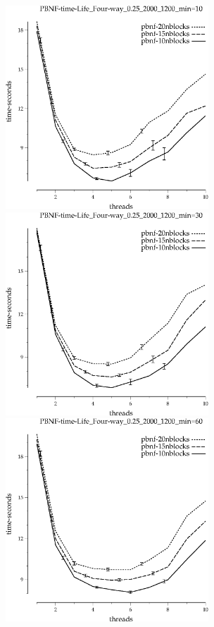 \documentclass{article}
\begin{document}
\begin{appendices}
\begin{figure}[h]
\begin{center}
\includegraphics[width=3in]{../graphs/grid_life_four-way_0.25_2000_1200/PBNF-time-Life_Four-way_0.25_2000_1200_min=10.eps}
\includegraphics[width=3in]{../graphs/grid_life_four-way_0.25_2000_1200/PBNF-time-Life_Four-way_0.25_2000_1200_min=30.eps}
\includegraphics[width=3in]{../graphs/grid_life_four-way_0.25_2000_1200/PBNF-time-Life_Four-way_0.25_2000_1200_min=60.eps}

\end{center}
\end{figure}
\end{appendices}
\end{document}
